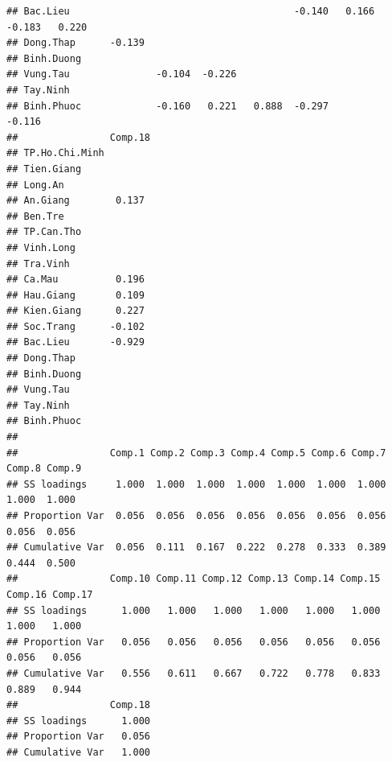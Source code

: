 \documentclass[../thesis.tex]{subfiles}
\begin{document}
\begin{verbatim}
## Bac.Lieu                                       -0.140   0.166  -0.183   0.220 
## Dong.Thap      -0.139                                                         
## Binh.Duong                                                                    
## Vung.Tau               -0.104  -0.226                                         
## Tay.Ninh                                                                      
## Binh.Phuoc             -0.160   0.221   0.888  -0.297                  -0.116 
##                Comp.18
## TP.Ho.Chi.Minh        
## Tien.Giang            
## Long.An               
## An.Giang        0.137 
## Ben.Tre               
## TP.Can.Tho            
## Vinh.Long             
## Tra.Vinh              
## Ca.Mau          0.196 
## Hau.Giang       0.109 
## Kien.Giang      0.227 
## Soc.Trang      -0.102 
## Bac.Lieu       -0.929 
## Dong.Thap             
## Binh.Duong            
## Vung.Tau              
## Tay.Ninh              
## Binh.Phuoc            
## 
##                Comp.1 Comp.2 Comp.3 Comp.4 Comp.5 Comp.6 Comp.7 Comp.8 Comp.9
## SS loadings     1.000  1.000  1.000  1.000  1.000  1.000  1.000  1.000  1.000
## Proportion Var  0.056  0.056  0.056  0.056  0.056  0.056  0.056  0.056  0.056
## Cumulative Var  0.056  0.111  0.167  0.222  0.278  0.333  0.389  0.444  0.500
##                Comp.10 Comp.11 Comp.12 Comp.13 Comp.14 Comp.15 Comp.16 Comp.17
## SS loadings      1.000   1.000   1.000   1.000   1.000   1.000   1.000   1.000
## Proportion Var   0.056   0.056   0.056   0.056   0.056   0.056   0.056   0.056
## Cumulative Var   0.556   0.611   0.667   0.722   0.778   0.833   0.889   0.944
##                Comp.18
## SS loadings      1.000
## Proportion Var   0.056
## Cumulative Var   1.000
\end{verbatim}

\newpage
\begin{Shaded}
	\begin{Highlighting}[]
\OtherTok{\textless{}{-}}\SpecialCharTok{::} \NormalTok{)}
\OtherTok{\textless{}{-}}\SpecialCharTok{\%\textgreater{}\%}\SpecialCharTok{::}
		 \NormalTok{,}
		 \NormalTok{,}
		 \NormalTok{,}
		 \NormalTok{)}
\OtherTok{\textless{}{-}}\SpecialCharTok{\%\textgreater{}\%}\SpecialCharTok{::}
		 \NormalTok{,}
		 \NormalTok{)}
\SpecialCharTok{::} \NormalTok{)}
	\end{Highlighting}
\end{Shaded}
\end{document}
